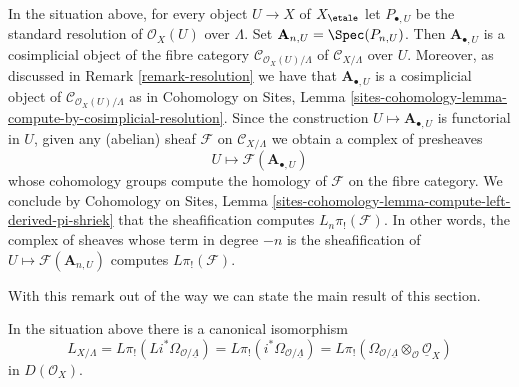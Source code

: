 \begin{remark}
\label{remark-compute-L-pi-shriek-spaces}
In the situation above, for every object $U \to X$ of $X_\etale$
let $P_{\bullet, U}$ be the standard resolution of $\mathcal{O}_X(U)$
over $\Lambda$. Set $\mathbf{A}_{n, U} = \Spec(P_{n, U})$.
Then $\mathbf{A}_{\bullet, U}$
is a cosimplicial object of the fibre category
$\mathcal{C}_{\mathcal{O}_X(U)/\Lambda}$ of
$\mathcal{C}_{X/\Lambda}$ over $U$. Moreover, as discussed
in Remark \ref{remark-resolution} we have that $\mathbf{A}_{\bullet, U}$
is a cosimplicial object of $\mathcal{C}_{\mathcal{O}_X(U)/\Lambda}$
as in Cohomology on Sites, Lemma
\ref{sites-cohomology-lemma-compute-by-cosimplicial-resolution}.
Since the construction $U \mapsto \mathbf{A}_{\bullet, U}$ is functorial
in $U$, given any (abelian) sheaf $\mathcal{F}$ on $\mathcal{C}_{X/\Lambda}$
we obtain a complex of presheaves
$$
U \longmapsto \mathcal{F}(\mathbf{A}_{\bullet, U})
$$
whose cohomology groups compute the homology of $\mathcal{F}$ on the fibre
category. We conclude by
Cohomology on Sites, Lemma
\ref{sites-cohomology-lemma-compute-left-derived-pi-shriek}
that the sheafification computes $L_n\pi_!(\mathcal{F})$.
In other words, the complex of sheaves whose term in degree $-n$ is
the sheafification of $U \mapsto \mathcal{F}(\mathbf{A}_{n, U})$ computes
$L\pi_!(\mathcal{F})$.
\end{remark}

\noindent
With this remark out of the way we can state the main
result of this section.

\begin{lemma}
\label{lemma-cotangent-morphism-spaces}
In the situation above there is a canonical isomorphism
$$
L_{X/\Lambda} = 
L\pi_!(Li^*\Omega_{\mathcal{O}/\underline{\Lambda}}) =
L\pi_!(i^*\Omega_{\mathcal{O}/\underline{\Lambda}}) =
L\pi_!(\Omega_{\mathcal{O}/\underline{\Lambda}}
\otimes_\mathcal{O} \underline{\mathcal{O}}_X)
$$
in $D(\mathcal{O}_X)$.
\end{lemma}

